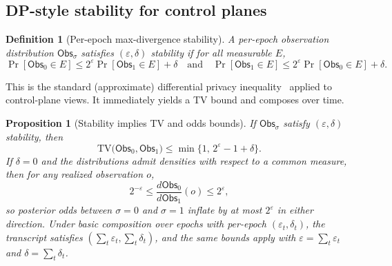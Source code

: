 \documentclass[11pt]{article}
\newtheorem{definition}{Definition}
\newtheorem{proposition}{Proposition}
\newcommand{\TV}{\mathrm{TV}}
\begin{document}
\subsection{DP-style stability for control planes}
\label{sec:dpstyle}

\begin{definition}[Per-epoch max-divergence stability]
A per-epoch observation distribution $\mathsf{Obs}_\sigma$ satisfies $(\varepsilon,\delta)$ stability if for all measurable $E$,
\[
\Pr[\mathsf{Obs}_0\in E] \le 2^{\varepsilon}\Pr[\mathsf{Obs}_1\in E]+\delta
\quad\text{and}\quad
\Pr[\mathsf{Obs}_1\in E] \le 2^{\varepsilon}\Pr[\mathsf{Obs}_0\in E]+\delta.
\]
\end{definition}

This is the standard (approximate) differential privacy inequality~\cite{dworkroth2014foundations} applied to control-plane views.
It immediately yields a TV bound and composes over time.

\begin{proposition}[Stability implies TV and odds bounds]
\label{prop:dp-to-tv-odds}
If $\mathsf{Obs}_\sigma$ satisfy $(\varepsilon,\delta)$ stability, then
\[
\TV\big(\mathsf{Obs}_0,\mathsf{Obs}_1\big) \le \min\{1,\,2^{\varepsilon}-1+\delta\}.
\]
If $\delta=0$ and the distributions admit densities with respect to a common measure, then for any realized observation $o$,
\[
2^{-\varepsilon} \le \frac{d\mathsf{Obs}_0}{d\mathsf{Obs}_1}(o) \le 2^{\varepsilon},
\]
so posterior odds between $\sigma=0$ and $\sigma=1$ inflate by at most $2^{\varepsilon}$ in either direction.
Under basic composition over epochs with per-epoch $(\varepsilon_t,\delta_t)$, the transcript satisfies $(\sum_t \varepsilon_t,\sum_t \delta_t)$, and the same bounds apply with $\varepsilon=\sum_t\varepsilon_t$ and $\delta=\sum_t\delta_t$.
\end{proposition}
\end{document}
